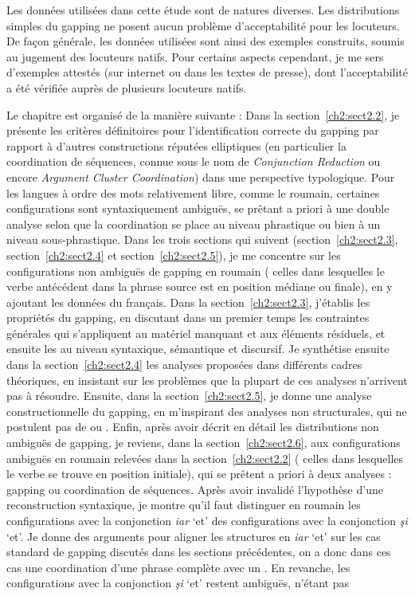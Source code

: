 Les données utilisées dans cette étude sont de natures diverses. Les distributions simples du gapping ne posent aucun problème d’acceptabilité pour les locuteurs. De façon générale, les données utilisées sont ainsi des exemples construits, soumis au jugement des locuteurs natifs. Pour certains aspects cependant, je me sers d'exemples attestés (sur internet ou dans les textes de presse), dont l’acceptabilité a été vérifiée auprès de plusieurs locuteurs natifs. 

\largerpage[-2]
Le chapitre est organisé de la manière suivante : Dans la section~\ref{ch2:sect2.2}, je pré\-sente les critères définitoires pour l’identification correcte du gapping par rapport à d’autres constructions réputées elliptiques (en particulier la coordination de séquences, connue sous le nom de \textit{Conjunction Reduction} ou encore \textit{Argument Cluster Coordination}) dans une perspective typologique. Pour les langues à ordre des mots relativement libre, comme le roumain, certaines configurations sont syntaxiquement ambiguës, se prêtant a priori à une double analyse selon que la coordination se place au niveau phrastique ou bien à un niveau sous-phrastique. Dans les trois sections qui suivent (section~\ref{ch2:sect2.3}, section~\ref{ch2:sect2.4} et section~\ref{ch2:sect2.5}), je me concentre sur les configurations non ambiguës de gapping en roumain ({\cad} celles dans lesquelles le verbe antécédent dans la phrase source est en position médiane ou finale), en y ajoutant les données du français. Dans la section~\ref{ch2:sect2.3}, j’établis les propriétés du gapping, en discutant dans un premier temps les contraintes générales qui s’appliquent au matériel manquant et aux éléments résiduels, et ensuite les  au niveau syntaxique, sémantique et discursif. Je synthétise ensuite dans la section~\ref{ch2:sect2.4} les analyses proposées dans différents cadres théoriques, en insistant sur les problèmes que la plupart de ces analyses n’arrivent pas à résoudre. Ensuite, dans la section~\ref{ch2:sect2.5}, je donne une analyse constructionnelle du gapping, en m’inspirant des analyses non structurales, qui ne postulent pas de  ou . Enfin, après avoir décrit en détail les distributions non ambiguës de gapping, je reviens, dans la section~\ref{ch2:sect2.6}, aux configurations ambiguës en roumain relevées dans la section~\ref{ch2:sect2.2} ({\cad} celles dans lesquelles le verbe se trouve en position initiale), qui se prêtent a priori à deux analyses : gapping ou coordination de séquences. Après avoir invalidé l’hypothèse d’une reconstruction syntaxique, je montre qu’il faut distinguer en roumain les configurations avec la conjonction \textit{iar} ‘et’ des configurations avec la conjonction \textit{şi} ‘et’. Je donne des arguments pour aligner les structures en \textit{iar} ‘et’ sur les cas standard de gapping discutés dans les sections précédentes, on a donc dans ces cas une coordination d’une phrase complète avec un . En revanche, les configurations avec la conjonction \textit{şi} ‘et’ restent ambiguës, n’étant pas 